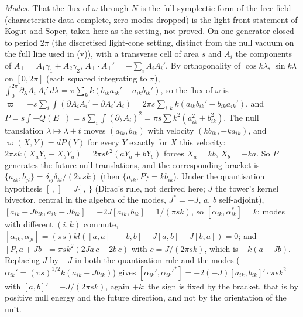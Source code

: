 \emph{Modes.} That the flux of $\omega$ through $N$ is the full symplectic form of the free field (characteristic data complete, zero modes dropped) is the light-front statement of Kogut and Soper, taken here as the setting, not proved. On one generator closed to period $2\pi$ (the discretised light-cone setting, distinct from the null vacuum on the full line used in (v)), with a transverse cell of area $s$ and $A_{i}$ the components of $A_{\perp} = A_{1}\gamma_{1} + A_{2}\gamma_{2}$, $A_{\perp}\cdot A_{\perp}' = -\sum_{i}A_{i}A_{i}'$. By orthogonality of $\cos k\lambda$, $\sin k\lambda$ on $[0, 2\pi]$ (each squared integrating to $\pi$), $\int_{0}^{2\pi}\partial_{\lambda}A_{i}\,A_{i}'\,d\lambda = \pi\sum_{k}k(b_{ik}a_{ik}' - a_{ik}b_{ik}')$, so the flux of $\omega$ is $\varpi = -s\sum_{i}\int(\partial A_{i}A_{i}' - \partial A_{i}'A_{i}) = 2\pi s\sum_{i,k}k(a_{ik}b_{ik}' - b_{ik}a_{ik}')$, and $P = s\int -Q(E_{\perp}) = s\sum_{i}\int(\partial_{\lambda}A_{i})^{2} = \pi s\sum k^{2}(a_{ik}^{2} + b_{ik}^{2})$. The null translation $\lambda \mapsto \lambda + t$ moves $(a_{ik}, b_{ik})$ with velocity $(kb_{ik}, -ka_{ik})$, and $\varpi(X, Y) = dP(Y)$ for every $Y$ exactly for $X$ this velocity: $2\pi sk(X_{a}Y_{b} - X_{b}Y_{a}) = 2\pi sk^{2}(aY_{a} + bY_{b})$ forces $X_{a} = kb$, $X_{b} = -ka$. So $P$ generates the future null translations, and the corresponding bracket is $\{a_{ik}, b_{jl}\} = \delta_{ij}\delta_{kl}/(2\pi sk)$ (then $\{a_{ik}, P\} = kb_{ik}$). Under the quantisation hypothesis $[\,,\,] = J\{\,,\,\}$ (Dirac's rule, not derived here; $J$ the tower's kernel bivector, central in the algebra of the modes, $J^{*} = -J$, $a$, $b$ self-adjoint), $[a_{ik} + Jb_{ik}, a_{ik} - Jb_{ik}] = -2J[a_{ik}, b_{ik}] = 1/(\pi sk)$, so $[\alpha_{ik}, \alpha_{ik}^{*}] = k$; modes with different $(i, k)$ commute, $[\alpha_{ik}, \alpha_{jl}] = (\pi s)kl([a, a] - [b, b] + J[a, b] + J[b, a]) = 0$; and $[P, a + Jb] = \pi sk^{2}(2J a\,c - 2b\,c)$ with $c = J/(2\pi sk)$, which is $-k(a + Jb)$. Replacing $J$ by $-J$ in both the quantisation rule and the modes ($\alpha_{ik}' = (\pi s)^{1/2}k(a_{ik} - Jb_{ik})$) gives $[\alpha_{ik}', \alpha_{ik}'^{*}] = -2(-J)[a_{ik}, b_{ik}]' \cdot \pi sk^{2}$ with $[a, b]' = -J/(2\pi sk)$, again $+k$: the sign is fixed by the bracket, that is by positive null energy and the future direction, and not by the orientation of the unit.

